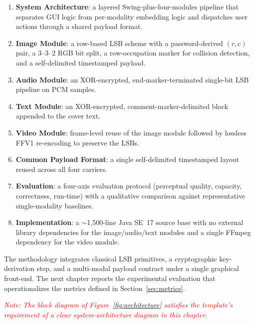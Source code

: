\begin{enumerate}
    \item \textbf{System Architecture}: a layered Swing-plus-four-modules pipeline that separates GUI logic from per-modality embedding logic and dispatches user actions through a shared payload format.
    \item \textbf{Image Module}: a row-based LSB scheme with a password-derived $(r, c)$ pair, a 3--3--2 RGB bit split, a row-occupation marker for collision detection, and a self-delimited timestamped payload.
    \item \textbf{Audio Module}: an XOR-encrypted, end-marker-terminated single-bit LSB pipeline on PCM samples.
    \item \textbf{Text Module}: an XOR-encrypted, comment-marker-delimited block appended to the cover text.
    \item \textbf{Video Module}: frame-level reuse of the image module followed by lossless FFV1 re-encoding to preserve the LSBs.
    \item \textbf{Common Payload Format}: a single self-delimited timestamped layout reused across all four carriers.
    \item \textbf{Evaluation}: a four-axis evaluation protocol (perceptual quality, capacity, correctness, run-time) with a qualitative comparison against representative single-modality baselines.
    \item \textbf{Implementation}: a $\sim$1{,}500-line Java SE~17 source base with no external library dependencies for the image/audio/text modules and a single FFmpeg dependency for the video module.
\end{enumerate}

The methodology integrates classical LSB primitives, a cryptographic key-derivation step, and a multi-modal payload contract under a single graphical front-end. The next chapter reports the experimental evaluation that operationalizes the metrics defined in Section~\ref{sec:metrics}.

\textit{\textcolor{red}{Note: The block diagram of Figure~\ref{fig:architecture} satisfies the template's requirement of a clear system-architecture diagram in this chapter.}}
